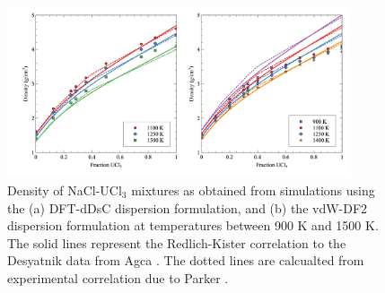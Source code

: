 \documentclass[preprint,3p,10pt,onecolumn,number,sort&compress]{elsarticle}
\begin{document}
{\begin{figure}[htb]
\centering
\includegraphics[width=0.9\textwidth]{fig6.jpg}
\caption{Density of NaCl-UCl$_3$ mixtures as obtained from simulations using the (a) DFT-dDsC dispersion formulation, and (b) the vdW-DF2 dispersion formulation at temperatures between 900 K and 1500 K. The solid lines represent the Redlich-Kister correlation to the Desyatnik \cite{Desyatnik} data from Agca \cite{agca2022}. The dotted lines are calcualted from experimental correlation due to Parker \cite{Parker}.%
} 
\label{fig:NaClUCl3}
\end{figure}

}
\end{document}
